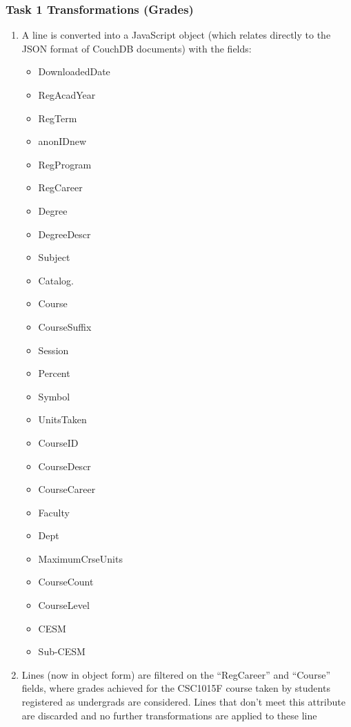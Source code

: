 \subsubsection{Task 1 Transformations (Grades)}
\begin{enumerate}
  \item A line is converted into a JavaScript object (which relates directly to the JSON format of CouchDB documents) with the fields:
        \begin{itemize}
          \item DownloadedDate
          \item RegAcadYear
          \item RegTerm
          \item anonIDnew
          \item RegProgram
          \item RegCareer
          \item Degree
          \item DegreeDescr
          \item Subject
          \item Catalog.
          \item Course
          \item CourseSuffix
          \item Session
          \item Percent
          \item Symbol
          \item UnitsTaken
          \item CourseID
          \item CourseDescr
          \item CourseCareer
          \item Faculty
          \item Dept
          \item MaximumCrseUnits
          \item CourseCount
          \item CourseLevel
          \item CESM
          \item Sub-CESM
        \end{itemize}
  \item Lines (now in object form) are filtered on the ``RegCareer'' and ``Course'' fields, where grades achieved for the CSC1015F course taken by students registered as undergrads are considered. Lines that don't meet this attribute are discarded and no further transformations are applied to these line

\end{enumerate}
